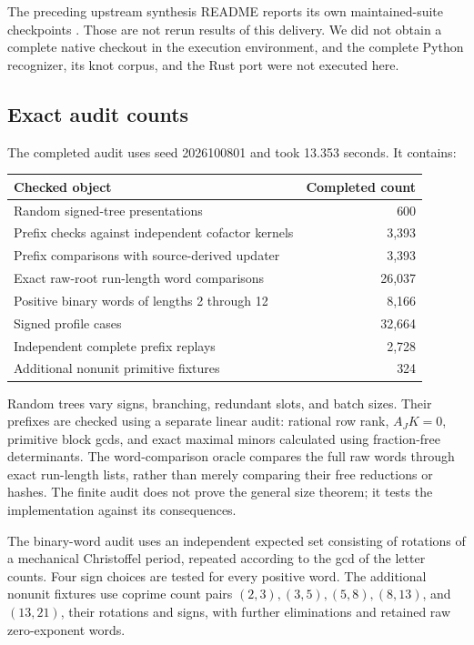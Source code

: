 \documentclass[11pt,letterpaper]{article}
\theoremstyle{definition}
\theoremstyle{remark}\newtheorem{remark}[theorem]{Remark}
\begin{document}
The preceding upstream synthesis README reports its own maintained-suite
checkpoints \cite{repo-synthesis}. Those are not rerun results of this delivery.
We did not obtain a complete native checkout in the execution environment,
and the complete Python recognizer, its knot corpus, and the Rust port were
not executed here.

\subsection{Exact audit counts}

The completed audit uses seed 2026100801 and took 13.353 seconds. It contains:
\begin{center}
\begin{tabular}{lr}
\toprule
Checked object & Completed count\\
\midrule
Random signed-tree presentations & 600\\
Prefix checks against independent cofactor kernels & 3,393\\
Prefix comparisons with source-derived updater & 3,393\\
Exact raw-root run-length word comparisons & 26,037\\
Positive binary words of lengths 2 through 12 & 8,166\\
Signed profile cases & 32,664\\
Independent complete prefix replays & 2,728\\
Additional nonunit primitive fixtures & 324\\
\bottomrule
\end{tabular}
\end{center}

Random trees vary signs, branching, redundant slots, and batch sizes. Their
prefixes are checked using a separate linear audit: rational row rank,
$A_JK=0$, primitive block gcds, and exact maximal minors calculated using
fraction-free determinants. The word-comparison oracle compares the full raw
words through exact run-length lists, rather than merely comparing their
free reductions or hashes. The finite audit does not prove the general
size theorem; it tests the implementation against its consequences.

The binary-word audit uses an independent expected set consisting of rotations
of a mechanical Christoffel period, repeated according to the gcd of the
letter counts. Four sign choices are tested for every positive word. The
additional nonunit fixtures use coprime count pairs $(2,3),(3,5),(5,8),(8,13)$,
and $(13,21)$, their rotations and signs, with further eliminations and
retained raw zero-exponent words.
\end{document}
